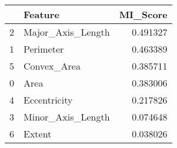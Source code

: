\begin{tabular}{llr}
\toprule
 & Feature & MI_Score \\
\midrule
2 & Major_Axis_Length & 0.491327 \\
1 & Perimeter & 0.463389 \\
5 & Convex_Area & 0.385711 \\
0 & Area & 0.383006 \\
4 & Eccentricity & 0.217826 \\
3 & Minor_Axis_Length & 0.074648 \\
6 & Extent & 0.038026 \\
\bottomrule
\end{tabular}
